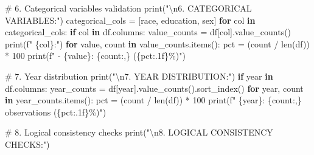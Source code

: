 \documentclass[
  letterpaper,
  DIV=11,
  numbers=noendperiod]{scrartcl}
\newenvironment{Shaded}{\begin{snugshade}}{\end{snugshade}}
\newcommand{\BuiltInTok}[1]{\textcolor[rgb]{0.00,0.23,0.31}{#1}}
\newcommand{\CharTok}[1]{\textcolor[rgb]{0.13,0.47,0.30}{#1}}
\newcommand{\CommentTok}[1]{\textcolor[rgb]{0.37,0.37,0.37}{#1}}
\newcommand{\ControlFlowTok}[1]{\textcolor[rgb]{0.00,0.23,0.31}{\textbf{#1}}}
\newcommand{\DecValTok}[1]{\textcolor[rgb]{0.68,0.00,0.00}{#1}}
\newcommand{\KeywordTok}[1]{\textcolor[rgb]{0.00,0.23,0.31}{\textbf{#1}}}
\newcommand{\NormalTok}[1]{\textcolor[rgb]{0.00,0.23,0.31}{#1}}
\newcommand{\OperatorTok}[1]{\textcolor[rgb]{0.37,0.37,0.37}{#1}}
\newcommand{\SpecialCharTok}[1]{\textcolor[rgb]{0.37,0.37,0.37}{#1}}
\newcommand{\SpecialStringTok}[1]{\textcolor[rgb]{0.13,0.47,0.30}{#1}}
\newcommand{\StringTok}[1]{\textcolor[rgb]{0.13,0.47,0.30}{#1}}
\begin{document}
\begin{Shaded}
\begin{Highlighting}[]
\CommentTok{\# 6. Categorical variables validation}
\BuiltInTok{print}\NormalTok{(}\StringTok{"}\CharTok{\textbackslash{}n}\StringTok{6. CATEGORICAL VARIABLES:"}\NormalTok{)}
\NormalTok{categorical\_cols }\OperatorTok{=}\NormalTok{ [}\StringTok{\textquotesingle{}race\textquotesingle{}}\NormalTok{, }\StringTok{\textquotesingle{}education\textquotesingle{}}\NormalTok{, }\StringTok{\textquotesingle{}sex\textquotesingle{}}\NormalTok{]}
\ControlFlowTok{for}\NormalTok{ col }\KeywordTok{in}\NormalTok{ categorical\_cols:}
    \ControlFlowTok{if}\NormalTok{ col }\KeywordTok{in}\NormalTok{ df.columns:}
\NormalTok{        value\_counts }\OperatorTok{=}\NormalTok{ df[col].value\_counts()}
        \BuiltInTok{print}\NormalTok{(}\SpecialStringTok{f"   }\SpecialCharTok{\{}\NormalTok{col}\SpecialCharTok{\}}\SpecialStringTok{:"}\NormalTok{)}
        \ControlFlowTok{for}\NormalTok{ value, count }\KeywordTok{in}\NormalTok{ value\_counts.items():}
\NormalTok{            pct }\OperatorTok{=}\NormalTok{ (count }\OperatorTok{/} \BuiltInTok{len}\NormalTok{(df)) }\OperatorTok{*} \DecValTok{100}
            \BuiltInTok{print}\NormalTok{(}\SpecialStringTok{f"     {-} }\SpecialCharTok{\{}\NormalTok{value}\SpecialCharTok{\}}\SpecialStringTok{: }\SpecialCharTok{\{}\NormalTok{count}\SpecialCharTok{:,\}}\SpecialStringTok{ (}\SpecialCharTok{\{}\NormalTok{pct}\SpecialCharTok{:.1f\}}\SpecialStringTok{\%)"}\NormalTok{)}

\CommentTok{\# 7. Year distribution}
\BuiltInTok{print}\NormalTok{(}\StringTok{"}\CharTok{\textbackslash{}n}\StringTok{7. YEAR DISTRIBUTION:"}\NormalTok{)}
\ControlFlowTok{if} \StringTok{\textquotesingle{}year\textquotesingle{}} \KeywordTok{in}\NormalTok{ df.columns:}
\NormalTok{    year\_counts }\OperatorTok{=}\NormalTok{ df[}\StringTok{\textquotesingle{}year\textquotesingle{}}\NormalTok{].value\_counts().sort\_index()}
    \ControlFlowTok{for}\NormalTok{ year, count }\KeywordTok{in}\NormalTok{ year\_counts.items():}
\NormalTok{        pct }\OperatorTok{=}\NormalTok{ (count }\OperatorTok{/} \BuiltInTok{len}\NormalTok{(df)) }\OperatorTok{*} \DecValTok{100}
        \BuiltInTok{print}\NormalTok{(}\SpecialStringTok{f"   }\SpecialCharTok{\{}\NormalTok{year}\SpecialCharTok{\}}\SpecialStringTok{: }\SpecialCharTok{\{}\NormalTok{count}\SpecialCharTok{:,\}}\SpecialStringTok{ observations (}\SpecialCharTok{\{}\NormalTok{pct}\SpecialCharTok{:.1f\}}\SpecialStringTok{\%)"}\NormalTok{)}

\CommentTok{\# 8. Logical consistency checks}
\BuiltInTok{print}\NormalTok{(}\StringTok{"}\CharTok{\textbackslash{}n}\StringTok{8. LOGICAL CONSISTENCY CHECKS:"}\NormalTok{)}


\end{Highlighting}
\end{Shaded}
\end{document}
